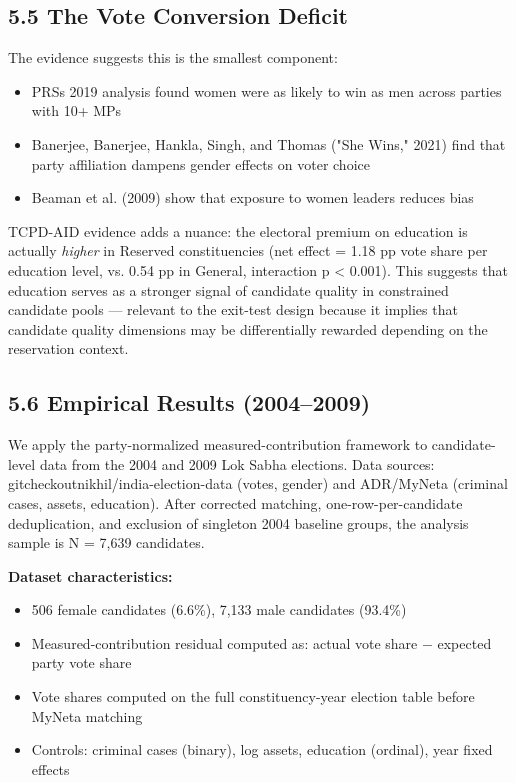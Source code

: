 \documentclass[
]{article}
\providecommand{\tightlist}{%
  \setlength{\itemsep}{0pt}\setlength{\parskip}{0pt}}
\begin{document}
\subsection{5.5 The Vote Conversion Deficit}\label{55-the-vote-conversion-deficit}

The evidence suggests this is the smallest component:

\begin{itemize}
\tightlist
\item
  PRS\textquotesingle s 2019 analysis found women were as likely to win as men across parties with 10+ MPs
\item
  Banerjee, Banerjee, Hankla, Singh, and Thomas ("She Wins," 2021) find that party affiliation dampens gender effects on voter choice
\item
  Beaman et al. (2009) show that exposure to women leaders reduces bias
\end{itemize}

TCPD-AID evidence adds a nuance: the electoral premium on education is actually \emph{higher} in Reserved constituencies (net effect = 1.18 pp vote share per education level, vs. 0.54 pp in General, interaction p \textless{} 0.001). This suggests that education serves as a stronger signal of candidate quality in constrained candidate pools --- relevant to the exit-test design because it implies that candidate quality dimensions may be differentially rewarded depending on the reservation context.

\subsection{5.6 Empirical Results (2004--2009)}\label{56-empirical-results-20042009}

We apply the party-normalized measured-contribution framework to candidate-level data from the 2004 and 2009 Lok Sabha elections. Data sources: gitcheckoutnikhil/india-election-data (votes, gender) and ADR/MyNeta (criminal cases, assets, education). After corrected matching, one-row-per-candidate deduplication, and exclusion of singleton 2004 baseline groups, the analysis sample is N = 7,639 candidates.

\textbf{Dataset characteristics:}

\begin{itemize}
\tightlist
\item
  506 female candidates (6.6\%), 7,133 male candidates (93.4\%)
\item
  Measured-contribution residual computed as: actual vote share $-$ expected party vote share
\item
  Vote shares computed on the full constituency-year election table before MyNeta matching
\item
  Controls: criminal cases (binary), log assets, education (ordinal), year fixed effects
\end{itemize}
\end{document}

